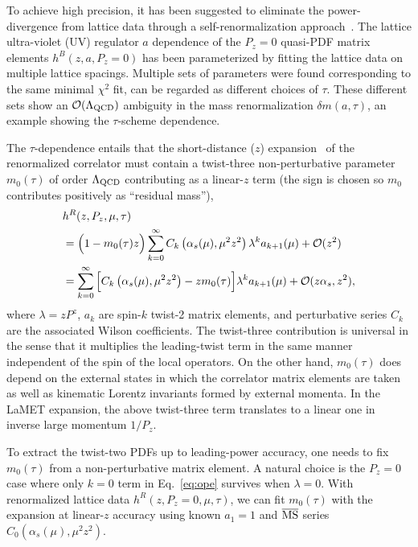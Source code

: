 \documentclass[prd,aps,nofootinbib,superscriptaddress,floatfix,preprintnumbers,twocolumn]{revtex4}
\begin{document}
To achieve high precision, it has been suggested to eliminate the power-divergence from lattice data through a self-renormalization approach~\cite{LatticePartonCollaborationLPC:2021xdx}.  The lattice ultra-violet (UV) regulator $a$ dependence of the $P_z=0$ quasi-PDF matrix elements $h^B(z,a,P_z=0)$ has been parameterized by fitting the lattice data on multiple lattice spacings. Multiple sets of parameters were found corresponding to the same minimal $\chi^2$ fit, can be regarded as different choices of $\tau$. These different sets show an $\mathcal{O}(\Lambda_{\rm QCD})$ ambiguity in the mass renormalization $\delta m(a,\tau)$, an example showing the $\tau$-scheme dependence. 

The $\tau$-dependence entails that the short-distance ($z$) expansion~\cite{Izubuchi:2018srq} of the renormalized correlator must contain a twist-three non-perturbative parameter $m_0(\tau)$ of order $\Lambda_{\rm QCD}$ contributing as a linear-$z$ term (the sign is chosen so $m_0$ contributes positively as ``residual mass''), 
\begin{align}
\label{eq:ope}
& h^R(z,P_z,\mu,\tau) \\ &= \Big(1-m_0(\tau) z\Big)\sum_{k=0}^\infty C_k\left(\alpha_s(\mu),\mu^2 z^2\right)
\lambda^k a_{k+1}(\mu)+ {\cal O}(z^2)\nonumber \\ 
&=\sum_{k=0}^\infty \Big[C_k\left(\alpha_s(\mu),\mu^2 z^2\right) - zm_0 (\tau) \Big] \lambda^k a_{k+1} (\mu) +  {\cal O}(z\alpha_s, z^2), \nonumber
\end{align}
where $\lambda = zP^z$,  $a_k$ are spin-$k$ twist-2 matrix elements, and perturbative series $C_k$ are the associated Wilson coefficients. The twist-three contribution is universal in the sense that it multiplies the leading-twist term in the same manner independent of the spin of the local operators. On the other hand, $m_0(\tau)$ does depend on the external states in which the correlator matrix elements are taken as well as kinematic Lorentz invariants formed by external momenta. In the LaMET expansion, the above twist-three term translates to a linear one in inverse large momentum $1/P_z$. 

To extract the twist-two PDFs up to  
leading-power accuracy, one needs to fix $m_0(\tau)$ from a non-perturbative matrix element. 
A natural choice is the $P_z=0$ case where only $k=0$ term in Eq.~\eqref{eq:ope} survives when $\lambda=0$. With renormalized lattice data  $h^R(z,P_z=0, \mu,\tau)$, we can fit $m_0(\tau)$ with the expansion at linear-$z$ accuracy using known $a_1=1$ and $\overline{\rm MS}$ series $C_0(\alpha_s(\mu),\mu^2z^2)$. 
\end{document}
